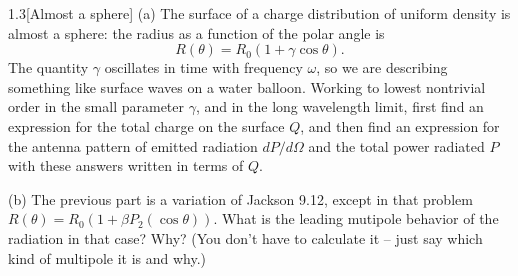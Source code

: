 \documentclass[12pt]{article}
\begin{document}
\begin{problem}{1.3}[Almost a sphere]
(a) The surface of a charge distribution of uniform density is almost a sphere:
the radius as a function of the polar angle is
\begin{equation}
    R(\theta)=R_0(1+\gamma\cos\theta). 
\end{equation}
The quantity $\gamma$ oscillates in time with frequency $\omega$, so we are
describing something like surface waves on a water balloon. Working to lowest
nontrivial order in the small parameter $\gamma$, and in the long wavelength
limit, first find an expression for the total charge on the surface $Q$, and
then find an expression for the antenna pattern of emitted radiation
$dP/d\Omega$ and the total power radiated $P$ with these answers written in
terms of $Q$.

(b) The previous part is a variation of Jackson 9.12, except in that problem
$R(\theta)=R_0(1+\beta P_2(\cos\theta))$. What is the leading mutipole behavior
of the radiation in that case? Why? (You don't have to calculate it -- just say
which kind of multipole it is and why.)
\begin{solution}
\end{solution}
\end{problem}
\end{document}
